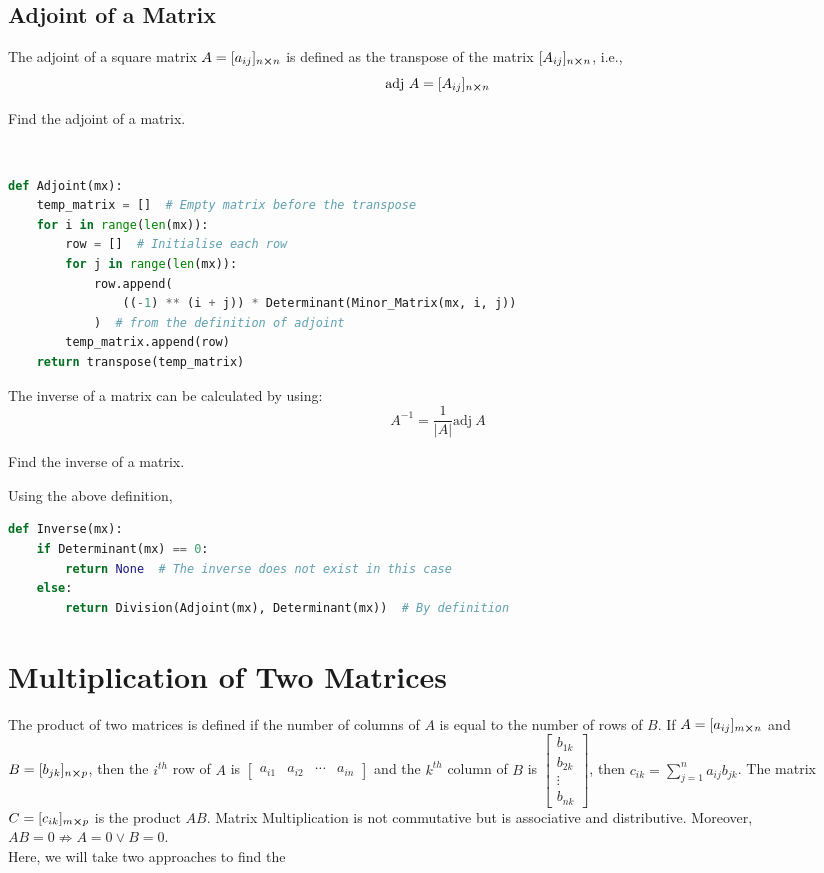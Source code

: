 	\subsection{Adjoint of a Matrix}
	The adjoint of a square matrix $A=[a_{ij}]_{n\cross n}$ is defined as the transpose of the matrix $[A_{ij}]_{n\cross n}$, i.e.,
	\[ \text{adj} \ A=[A_{ij}]_{n\cross n}\]
	\begin{eg}
		Find the adjoint of a matrix.
	\end{eg}
	\begin{explanation} \phantom \\
		\begin{lstlisting}[language=Python]
def Adjoint(mx):
    temp_matrix = []  # Empty matrix before the transpose
    for i in range(len(mx)):
        row = []  # Initialise each row
        for j in range(len(mx)):
            row.append(
                ((-1) ** (i + j)) * Determinant(Minor_Matrix(mx, i, j))
            )  # from the definition of adjoint
        temp_matrix.append(row)
    return transpose(temp_matrix) \end{lstlisting}
	\end{explanation}
	The inverse of a matrix can be calculated by using:
	\[A^{-1}=\frac{1}{|A|}\text{adj} \ A\]
	\begin{eg}
		Find the inverse of a matrix.
	\end{eg}
	\begin{explanation}
		Using the above definition,
		\begin{lstlisting}[language=Python]
def Inverse(mx):
	if Determinant(mx) == 0:
		return None  # The inverse does not exist in this case
	else:
		return Division(Adjoint(mx), Determinant(mx))  # By definition \end{lstlisting}
	\end{explanation}
	\section{Multiplication of Two Matrices}
	The product of two matrices is defined if the number of columns of $A$ is equal to the number of rows of $B$. If $A=[a_{ij}]_{m\cross n}$ and $B=[b_{jk}]_{n\cross p}$, then the $i^{th}$ row of $A$ is $ \begin{bmatrix}
		a_{i1}& a_{i2}& \cdots & a_{in}
	\end{bmatrix}$ and the $k^{th}$ column of $B$ is $ \begin{bmatrix}
	b_{1k} \\
	b_{2k} \\
	\vdots \\
	b_{nk}
	\end{bmatrix}$, then $c_{ik}=\sum\limits_{j=1}^{n}a_{ij}b_{jk}$. The matrix $C=[c_{ik}]_{m\cross p}$ is the product $A B$. Matrix Multiplication is not commutative but is associative and distributive. Moreover, $AB=0 \nRightarrow A=0 \lor B=0$.\\
	Here, we will take two approaches to find the 


